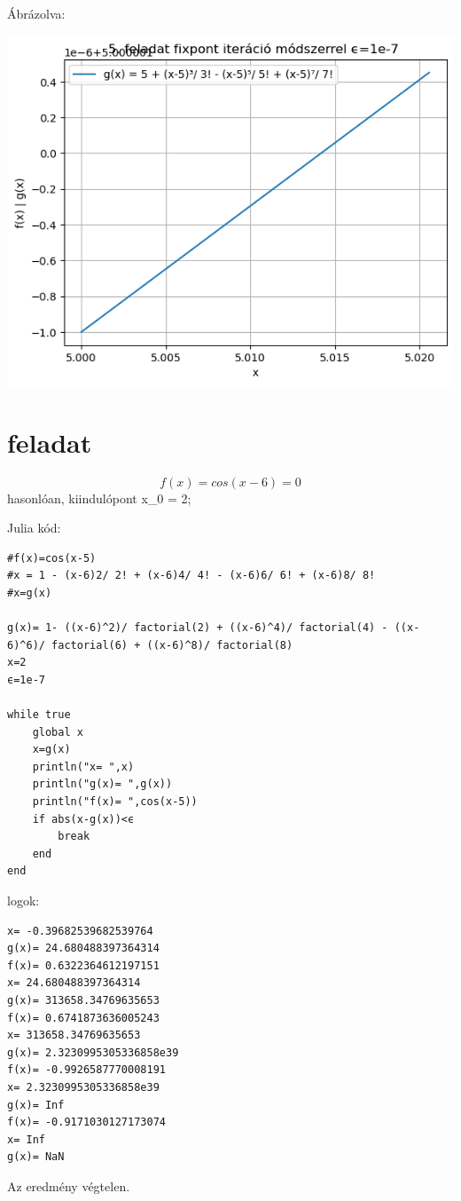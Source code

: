 \documentclass{article}
\begin{document}
Ábrázolva:

\includegraphics[scale=1]{../plot_7.png} 

\section{feladat}
\begin{equation}
f(x)= cos(x-6) =0
\end{equation}
hasonlóan, kiindulópont x_0 = 2; 

Julia kód:

\begin{verbatim}
#f(x)=cos(x-5)
#x = 1 - (x-6)2/ 2! + (x-6)4/ 4! - (x-6)6/ 6! + (x-6)8/ 8!
#x=g(x)

g(x)= 1- ((x-6)^2)/ factorial(2) + ((x-6)^4)/ factorial(4) - ((x-6)^6)/ factorial(6) + ((x-6)^8)/ factorial(8)
x=2
ϵ=1e-7

while true
    global x
    x=g(x)
    println("x= ",x)
    println("g(x)= ",g(x))
    println("f(x)= ",cos(x-5))
    if abs(x-g(x))<ϵ
        break
    end
end
\end{verbatim}

logok:

\begin{verbatim}
x= -0.39682539682539764
g(x)= 24.680488397364314
f(x)= 0.6322364612197151   
x= 24.680488397364314      
g(x)= 313658.34769635653   
f(x)= 0.6741873636005243   
x= 313658.34769635653      
g(x)= 2.3230995305336858e39
f(x)= -0.9926587770008191  
x= 2.3230995305336858e39   
g(x)= Inf
f(x)= -0.9171030127173074
x= Inf
g(x)= NaN
\end{verbatim} 
Az eredmény végtelen.
\end{document}
